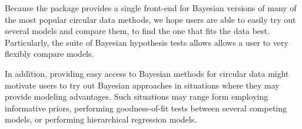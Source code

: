 Because the package provides a single front-end for Bayesian versions of
many of the most popular circular data methods, we hope users are able
to easily try out several models and compare them, to find the one that
fits the data best. Particularly, the suite of Bayesian hypothesis tests
allows allows a user to very flexibly compare models.

In addition, providing easy access to Bayesian methods for circular data
might motivate users to try out Bayesian approaches in situations where
they may provide modeling advantages. Such situations may range form
employing informative priors, performing goodness-of-fit tests between
several competing models, or performing hierarchical regression models.

